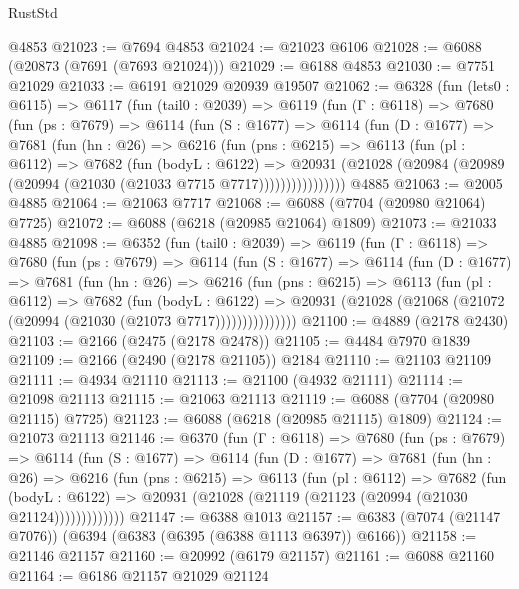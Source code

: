 \begin{lexlean}{RustStd}
\begin{coremodule}
    @4853
@21023 := @7694 @4853
@21024 := @21023 @6106
@21028 := @6088 (@20873 (@7691 (@7693 @21024)))
@21029 := @6188 @4853
@21030 := @7751 @21029
@21033 := @6191 @21029 @20939 @19507
@21062 := @6328
    (fun (lets0 : @6115) =>
    @6117
      (fun (tail0 : @2039) =>
      @6119
        (fun (Γ : @6118) =>
        @7680
          (fun (ps : @7679) =>
          @6114
            (fun (S : @1677) =>
            @6114
              (fun (D : @1677) =>
              @7681
                (fun (hn : @26) =>
                @6216
                  (fun (pns : @6215) =>
                  @6113
                    (fun (pl : @6112) =>
                    @7682
                      (fun (bodyL : @6122) =>
                      @20931
                        (@21028 (@20984 (@20989 (@20994 (@21030 (@21033 @7715 @7717))))))))))))))))
    @4885
@21063 := @2005 @4885
@21064 := @21063 @7717
@21068 := @6088 (@7704 (@20980 @21064) @7725)
@21072 := @6088 (@6218 (@20985 @21064) @1809)
@21073 := @21033 @4885
@21098 := @6352
    (fun (tail0 : @2039) =>
    @6119
      (fun (Γ : @6118) =>
      @7680
        (fun (ps : @7679) =>
        @6114
          (fun (S : @1677) =>
          @6114
            (fun (D : @1677) =>
            @7681
              (fun (hn : @26) =>
              @6216
                (fun (pns : @6215) =>
                @6113
                  (fun (pl : @6112) =>
                  @7682
                    (fun (bodyL : @6122) =>
                    @20931 (@21028 (@21068 (@21072 (@20994 (@21030 (@21073 @7717)))))))))))))))
@21100 := @4889 (@2178 @2430)
@21103 := @2166 (@2475 (@2178 @2478))
@21105 := @4484 @7970 @1839
@21109 := @2166 (@2490 (@2178 @21105)) @2184
@21110 := @21103 @21109
@21111 := @4934 @21110
@21113 := @21100 (@4932 @21111)
@21114 := @21098 @21113
@21115 := @21063 @21113
@21119 := @6088 (@7704 (@20980 @21115) @7725)
@21123 := @6088 (@6218 (@20985 @21115) @1809)
@21124 := @21073 @21113
@21146 := @6370
    (fun (Γ : @6118) =>
    @7680
      (fun (ps : @7679) =>
      @6114
        (fun (S : @1677) =>
        @6114
          (fun (D : @1677) =>
          @7681
            (fun (hn : @26) =>
            @6216
              (fun (pns : @6215) =>
              @6113
                (fun (pl : @6112) =>
                @7682
                  (fun (bodyL : @6122) =>
                  @20931 (@21028 (@21119 (@21123 (@20994 (@21030 @21124)))))))))))))
@21147 := @6388 @1013
@21157 := @6383 (@7074 (@21147 @7076)) (@6394 (@6383 (@6395 (@6388 @1113 @6397)) @6166))
@21158 := @21146 @21157
@21160 := @20992 (@6179 @21157)
@21161 := @6088 @21160
@21164 := @6186 @21157 @21029 @21124

\end{coremodule}
\end{lexlean}
